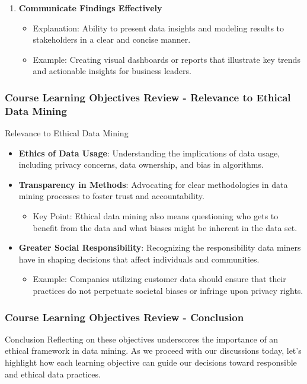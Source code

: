 \documentclass[aspectratio=169]{beamer}
\begin{document}
\begin{frame}[fragile]
\begin{enumerate}
        \item \textbf{Communicate Findings Effectively}
            \begin{itemize}
                \item Explanation: Ability to present data insights and modeling results to stakeholders in a clear and concise manner.
                \item Example: Creating visual dashboards or reports that illustrate key trends and actionable insights for business leaders.
            \end{itemize}
    \end{enumerate}
\end{frame}

\begin{frame}[fragile]
    \frametitle{Course Learning Objectives Review - Relevance to Ethical Data Mining}
    \begin{block}{Relevance to Ethical Data Mining}
        \begin{itemize}
            \item \textbf{Ethics of Data Usage}: Understanding the implications of data usage, including privacy concerns, data ownership, and bias in algorithms.
            \item \textbf{Transparency in Methods}: Advocating for clear methodologies in data mining processes to foster trust and accountability.
                \begin{itemize}
                    \item Key Point: Ethical data mining also means questioning who gets to benefit from the data and what biases might be inherent in the data set.
                \end{itemize}
            \item \textbf{Greater Social Responsibility}: Recognizing the responsibility data miners have in shaping decisions that affect individuals and communities.
                \begin{itemize}
                    \item Example: Companies utilizing customer data should ensure that their practices do not perpetuate societal biases or infringe upon privacy rights.
                \end{itemize}
        \end{itemize}
    \end{block}
\end{frame}

\begin{frame}[fragile]
    \frametitle{Course Learning Objectives Review - Conclusion}
    \begin{block}{Conclusion}
        Reflecting on these objectives underscores the importance of an ethical framework in data mining. As we proceed with our discussions today, let’s highlight how each learning objective can guide our decisions toward responsible and ethical data practices.
    \end{block}
\end{frame}
\end{document}
